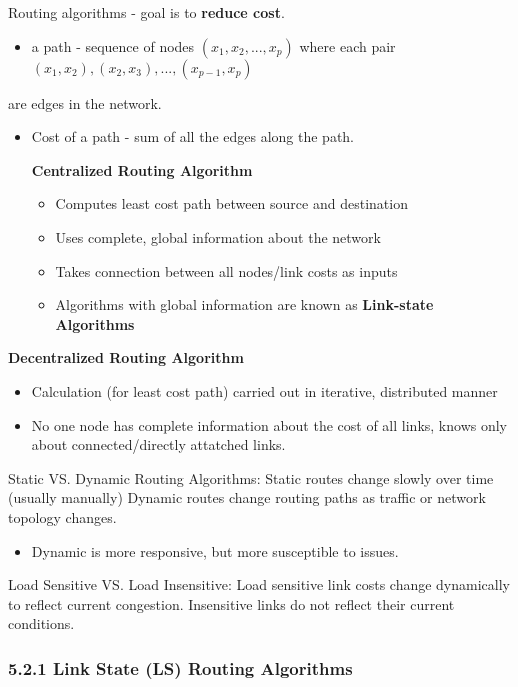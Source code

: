 \documentclass[11pt]{article}
\begin{document}
Routing algorithms - goal is to \textbf{reduce cost}.
\begin{itemize}
\item a path - sequence of nodes \((x_{1}, x_{2}, ... , x_{p})\) where each pair \((x_{1}, x_{2}), (x_{2}, x_{3}), ... , (x_{p-1}, x_{p})\)
\end{itemize}
are edges in the network.
\begin{itemize}
\item Cost of a path - sum of all the edges along the path.

\textbf{Centralized Routing Algorithm}

\begin{itemize}
\item Computes least cost path between source and destination

\item Uses complete, global information about the network

\item Takes connection between all nodes/link costs as inputs

\item Algorithms with global information are known as \textbf{Link-state Algorithms}
\end{itemize}
\end{itemize}


\textbf{Decentralized Routing Algorithm}

\begin{itemize}
\item Calculation (for least cost path) carried out in iterative, distributed manner
\item No one node has complete information about the cost of all links, knows only about connected/directly attatched links.
\end{itemize}


Static VS. Dynamic Routing Algorithms:
Static routes change slowly over time (usually manually)
Dynamic routes change routing paths as traffic or network topology changes.
\begin{itemize}
\item Dynamic is more responsive, but more susceptible to issues.
\end{itemize}


Load Sensitive VS. Load Insensitive:
Load sensitive link costs change dynamically to reflect current congestion.
Insensitive links do not reflect their current conditions.

\subsubsection{5.2.1 Link State (LS) Routing Algorithms}
\label{sec:org178b995}
\end{document}
